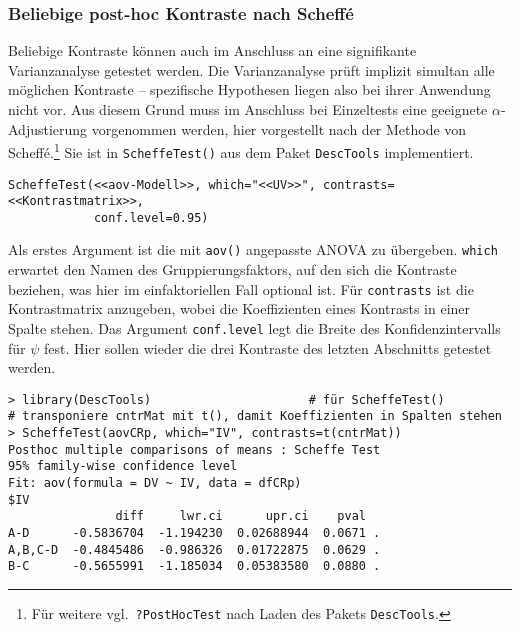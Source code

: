 \subsubsection{Beliebige post-hoc Kontraste nach Scheffé}

Beliebige Kontraste können auch im Anschluss an eine signifikante Varianzanalyse getestet werden. Die Varianzanalyse prüft implizit simultan alle möglichen Kontraste -- spezifische Hypothesen liegen also bei ihrer Anwendung nicht vor. Aus diesem Grund muss im Anschluss bei Einzeltests eine geeignete $\alpha$-Adjustierung vorgenommen werden, hier vorgestellt nach der Methode von Scheffé.\footnote{Für weitere vgl.\ \lstinline!?PostHocTest! nach Laden des Pakets \lstinline!DescTools!.} Sie ist in \lstinline!ScheffeTest()! aus dem Paket \lstinline!DescTools! implementiert.
\begin{lstlisting}
ScheffeTest(<<aov-Modell>>, which="<<UV>>", contrasts=<<Kontrastmatrix>>,
            conf.level=0.95)
\end{lstlisting}

Als erstes Argument ist die mit \lstinline!aov()! angepasste ANOVA zu übergeben. \lstinline!which! erwartet den Namen des Gruppierungsfaktors, auf den sich die Kontraste beziehen, was hier im einfaktoriellen Fall optional ist. Für \lstinline!contrasts! ist die Kontrastmatrix anzugeben, wobei die Koeffizienten eines Kontrasts in einer Spalte stehen. Das Argument \lstinline!conf.level! legt die Breite des Konfidenzintervalls für $\psi$ fest. Hier sollen wieder die drei Kontraste des letzten Abschnitts getestet werden.
\begin{lstlisting}
> library(DescTools)                      # für ScheffeTest()
# transponiere cntrMat mit t(), damit Koeffizienten in Spalten stehen
> ScheffeTest(aovCRp, which="IV", contrasts=t(cntrMat))
Posthoc multiple comparisons of means : Scheffe Test
95% family-wise confidence level
Fit: aov(formula = DV ~ IV, data = dfCRp)
$IV
               diff     lwr.ci      upr.ci    pval
A-D      -0.5836704  -1.194230  0.02688944  0.0671 .
A,B,C-D  -0.4845486  -0.986326  0.01722875  0.0629 .
B-C      -0.5655991  -1.185034  0.05383580  0.0880 .
\end{lstlisting}

